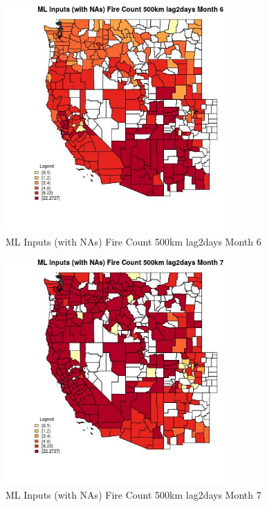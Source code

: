 \begin{figure} 
\centering  
\includegraphics[width=0.77\textwidth]{Code_Outputs/Report_ML_input_PM25_Step4_part_f_de_duplicated_aveswNAs_CountyFire_Count_500km_lag2daysmedianMonth6.jpg} 
\caption{\label{fig:Report_ML_input_PM25_Step4_part_f_de_duplicated_aveswNAsCountyFire_Count_500km_lag2daysmedianMonth6}ML Inputs (with NAs) Fire Count 500km lag2days Month 6} 
\end{figure} 
 

\begin{figure} 
\centering  
\includegraphics[width=0.77\textwidth]{Code_Outputs/Report_ML_input_PM25_Step4_part_f_de_duplicated_aveswNAs_CountyFire_Count_500km_lag2daysmedianMonth7.jpg} 
\caption{\label{fig:Report_ML_input_PM25_Step4_part_f_de_duplicated_aveswNAsCountyFire_Count_500km_lag2daysmedianMonth7}ML Inputs (with NAs) Fire Count 500km lag2days Month 7} 
\end{figure} 
 

